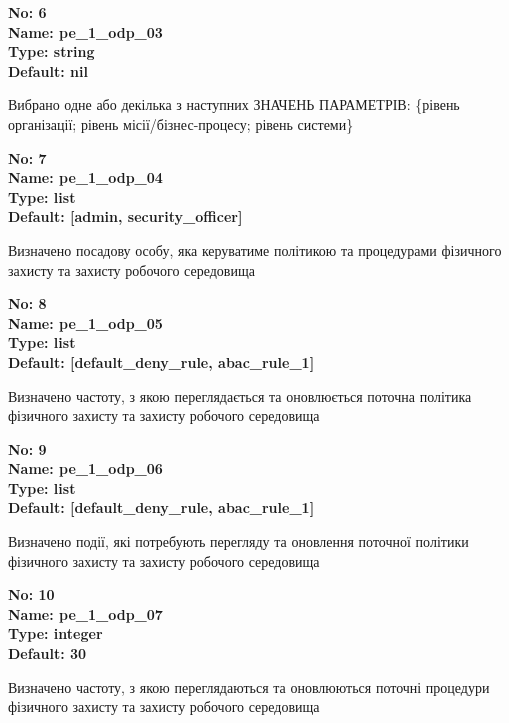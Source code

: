 \documentclass{article}
\begin{document}
{\footnotesize\bfseries
No: 6\\
Name: pe\_\allowbreak{}1\_\allowbreak{}odp\_\allowbreak{}03\\
Type: string\\
Default: nil
}

{\footnotesize Вибрано одне або декілька з наступних ЗНАЧЕНЬ ПАРАМЕТРІВ: \{рівень організації; рівень місії/бізнес-процесу; рівень системи\}}


{\footnotesize\bfseries
No: 7\\
Name: pe\_\allowbreak{}1\_\allowbreak{}odp\_\allowbreak{}04\\
Type: list\\
Default: [\textquotedbl{}admin\textquotedbl{}, \textquotedbl{}security\_\allowbreak{}officer\textquotedbl{}]
}

{\footnotesize Визначено посадову особу, яка керуватиме політикою та процедурами фізичного захисту та захисту робочого середовища}


{\footnotesize\bfseries
No: 8\\
Name: pe\_\allowbreak{}1\_\allowbreak{}odp\_\allowbreak{}05\\
Type: list\\
Default: [\textquotedbl{}default\_\allowbreak{}deny\_\allowbreak{}rule\textquotedbl{}, \textquotedbl{}abac\_\allowbreak{}rule\_\allowbreak{}1\textquotedbl{}]
}

{\footnotesize Визначено частоту, з якою переглядається та оновлюється поточна політика фізичного захисту та захисту робочого середовища}


{\footnotesize\bfseries
No: 9\\
Name: pe\_\allowbreak{}1\_\allowbreak{}odp\_\allowbreak{}06\\
Type: list\\
Default: [\textquotedbl{}default\_\allowbreak{}deny\_\allowbreak{}rule\textquotedbl{}, \textquotedbl{}abac\_\allowbreak{}rule\_\allowbreak{}1\textquotedbl{}]
}

{\footnotesize Визначено події, які потребують перегляду та оновлення поточної політики фізичного захисту та захисту робочого середовища}


{\footnotesize\bfseries
No: 10\\
Name: pe\_\allowbreak{}1\_\allowbreak{}odp\_\allowbreak{}07\\
Type: integer\\
Default: 30
}

{\footnotesize Визначено частоту, з якою переглядаються та оновлюються поточні процедури фізичного захисту та захисту робочого середовища}
\end{document}
